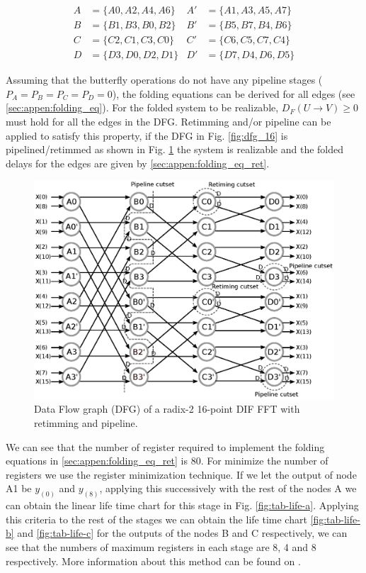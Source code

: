\documentclass[journal,comsoc]{IEEEtran}
\begin{document}
\begin{align*}
    A&= \{ A0,A2,A4,A6 \}  & A'&= \{ A1,A3,A5,A7 \} \\
    B&=\{ B1,B3,B0,B2 \}  &B'&=\{ B5,B7,B4,B6 \} \\
    C&=\{ C2,C1,C3,C0 \}  &C'&=\{ C6,C5,C7,C4 \} \\ 
    D&=\{ D3,D0,D2,D1 \}  &D'&=\{ D7,D4,D6,D5 \} 
    \label{eq:foldingset_16}
\end{align*}

Assuming that the butterfly operations do not have any pipeline stages ($P_A=P_B=P_C=P_D=0$), the folding equations can be derived for all edges (see \ref{sec:appen:folding_eq}). For the folded system to be realizable, $D_F(U\to V)\geq0$ must hold for all the edges in the DFG. Retimming and/or pipeline can be applied to satisfy this property, if the DFG in Fig. \ref{fig:dfg_16} is pipelined/retimmed as shown in Fig. \ref{fig:dfg_16_ret} the system is realizable and the folded delays for the edges are given by \ref{sec:appen:folding_eq_ret}.

\begin{figure}[htbp]%
\centering
 \includegraphics[width=\linewidth]{Diagramas/Butter16_pipe.eps}%
\caption{Data Flow graph (DFG) of a radix-2 16-point DIF FFT with retimming and pipeline.}
\label{fig:dfg_16_ret}
\end{figure}

We can see that the number of register required to implement the folding equations in \ref{sec:appen:folding_eq_ret} is 80. For minimize the number of registers we use the register minimization technique. 
If we let the output of node A1 be $y_{(0)}$ and $y_{(8)}$, applying this successively with the rest of the nodes A we can obtain the linear life time chart for this stage in Fig. \ref{fig:tab-life-a}. Applying this criteria to the rest of the stages we can obtain the life time chart \ref{fig:tab-life-b} and \ref{fig:tab-life-c} for the outputs of the nodes B and C respectively, we can see that the numbers of maximum registers in each stage are 8, 4 and 8 respectively. More information about this method can be found on \cite{pipeline_parhi_book}.
\end{document}
